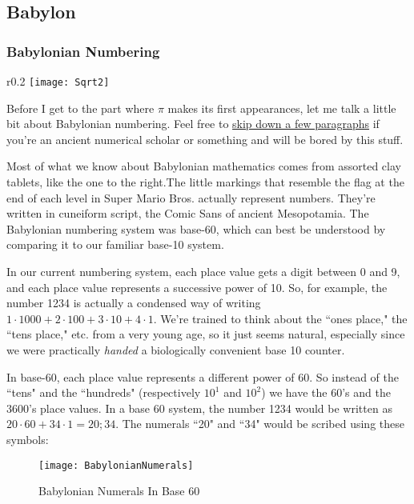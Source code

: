 \documentclass[11pt,titlepage]{article}
\begin{document}
\subsection*{Babylon} 

\subsubsection*{Babylonian Numbering}

\begin{wrapfigure}{r}{0.2\textwidth}
\centering
\vspace{-0.7cm}
\texttt{[image: Sqrt2]}
\end{wrapfigure}
Before I get to the part where $\pi$ makes its first appearances, let me talk a little bit about Babylonian numbering. Feel free to \hyperref[babylonpi]{skip down a few paragraphs} if you're an ancient numerical scholar or something and will be bored by this stuff. 

Most of what we know about Babylonian mathematics comes from assorted clay tablets, like the one to the right.The little markings that resemble the flag at the end of each level in Super Mario Bros. actually represent numbers. They're written in cuneiform script, the Comic Sans of ancient Mesopotamia. The Babylonian numbering system was base-60, which can best be understood by comparing it to our familiar base-10 system. 

In our current numbering system, each place value gets a digit between 0 and 9, and each place value represents a successive power of 10. So, for example, the number 1234 is actually a condensed way of writing $1\cdot 1000 + 2\cdot 100 + 3\cdot 10 + 4\cdot 1$. We're trained to think about the ``ones place," the ``tens place," etc. from a very young age, so it just seems natural, especially since we were practically \textit{handed} a biologically convenient base 10 counter.

In base-60, each place value represents a different power of 60. So instead of the ``tens" and the ``hundreds" (respectively $10^1$ and $10^2$) we have the $60$'s and the $3600$'s place values. In a base 60 system, the number 1234 would be written as $20\cdot 60 + 34\cdot 1 = 20;34$. The numerals ``20" and ``34" would be scribed using these symbols:

\begin{figure}[h]
\centering
\texttt{[image: BabylonianNumerals]}
\caption{Babylonian Numerals In Base 60}
\end{figure}
\end{document}
